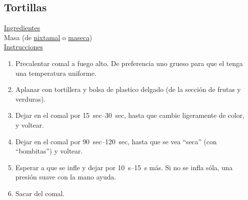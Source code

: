 \subsection{Tortillas}

\underline{Ingredientes}\\
Masa (de \hyperref[receta:masa-maiz]{nixtamal} o \hyperref[receta:masa-maseca]{maseca})\\

\underline{Instrucciones}
\begin{enumerate}
\item Precalentar comal a fuego alto. De preferencia uno grueso para que el tenga una temperatura uniforme.
\item Aplanar con tortillera y bolsa de plastico delgado (de la sección de frutas y verduras).
\item Dejar en el comal por \SIrange{15}{30}{sec}, hasta que cambie ligeramente de color, y voltear.
\item Dejar en el comal por \SIrange{90}{120}{sec}, hasta que se vea ``seca'' (con ``bombitas'') y voltear.
\item Esperar a que se infle y dejar por \SIrange{10}{15}{s} más. Si no se infla sóla, una presión suave con la mano ayuda.
\item Sacar del comal.
\end{enumerate}

